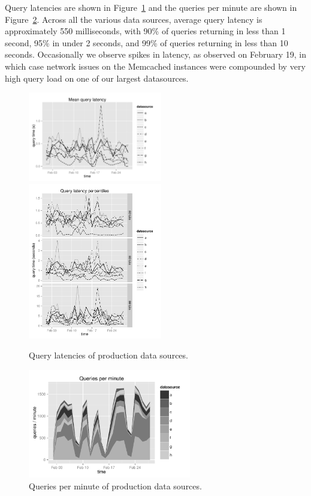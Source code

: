 \documentclass{sig-alternate-2013}
\begin{document}
Query latencies are shown in Figure~\ref{fig:query_latency} and the queries per
minute are shown in Figure~\ref{fig:queries_per_min}. Across all the various
data sources, average query latency is approximately 550 milliseconds, with
90\% of queries returning in less than 1 second, 95\% in under 2 seconds, and
99\% of queries returning in less than 10 seconds.  Occasionally we observe
spikes in latency, as observed on February 19, in which case network issues on
the Memcached instances were compounded by very high query load on one of our
largest datasources.

\begin{figure}
\centering 
\includegraphics[width = 2.3in]{avg_query_latency}
\includegraphics[width = 2.3in]{query_percentiles}
\caption{Query latencies of production data sources.} 
\label{fig:query_latency}
\end{figure}

\begin{figure}
\centering 
\includegraphics[width = 2.8in]{queries_per_min}
\caption{Queries per minute of production data sources.} 
\label{fig:queries_per_min}
\end{figure}
\end{document}
